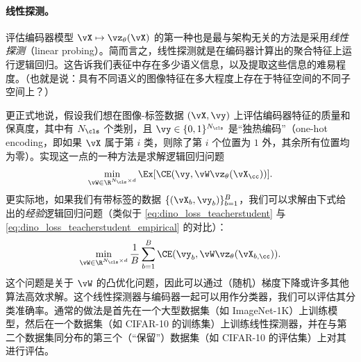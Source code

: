 \documentclass[../../book-main_zh.tex]{subfiles}
\begin{document}
\paragraph{线性探测。}

评估编码器模型 \(\vX \mapsto \vz_{\theta}(\vX)\) 的第一种也是最与架构无关的方法是采用\textit{线性探测}（linear probing）。简而言之，线性探测就是在编码器计算出的聚合特征上运行逻辑回归。这告诉我们表征中存在多少语义信息，以及提取这些信息的难易程度。（也就是说：具有不同语义的图像特征在多大程度上存在于特征空间的不同子空间上？）

更正式地说，假设我们想在图像-标签数据 \((\vX, \vy)\) 上评估编码器特征的质量和保真度，其中有 \(N_{\cls}\) 个类别，且 \(\vy \in \{0, 1\}^{N_{\cls}}\) 是“独热编码”（one-hot encoding，即如果 \(\vX\) 属于第 \(i\) 类，则除了第 \(i\) 个位置为 \(1\) 外，其余所有位置均为零）。实现这一点的一种方法是求解逻辑回归问题
\begin{equation}\label{eq:linear_probing}
\min_{\vW \in \R^{N_{\cls} \times d}}\Ex[\CE(\vy, \vW \vz_{\theta}(\vX_{\cc}))].
\end{equation}
更实际地，如果我们有带标签的数据 \(\{(\vX_{b}, \vy_{b})\}_{b = 1}^{B}\)，我们可以求解由下式给出的\textit{经验}逻辑回归问题（类似于 \eqref{eq:dino_loss_teacherstudent} 与 \eqref{eq:dino_loss_teacherstudent_empirical} 的对比）：
\begin{equation}\label{eq:linear_probing_empirical}
\min_{\vW \in \R^{N_{\cls} \times d}}\frac{1}{B}\sum_{b =
1}^{B}\CE(\vy_{b}, \vW \vz_{\theta}(\vX_{b, \cc})).
\end{equation}
这个问题是关于 \(\vW\) 的凸优化问题，因此可以通过（随机）梯度下降或许多其他算法高效求解。这个线性探测器与编码器一起可以用作分类器，我们可以评估其分类准确率。通常的做法是首先在一个大型数据集（如 ImageNet-1K）上训练模型，然后在一个数据集（如 CIFAR-10 的训练集）上训练线性探测器，并在与第二个数据集同分布的第三个（“保留”）数据集（如 CIFAR-10 的评估集）上对其进行评估。
\end{document}
